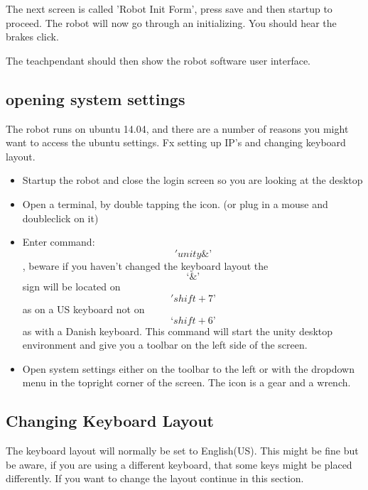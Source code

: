 \documentclass{article}
\begin{document}
The next screen is called 'Robot Init Form', press save and then startup to proceed. The robot will now go through an initializing. You should hear the brakes click.

The teachpendant should then show the robot software user interface.  

\subsection{opening system settings}
\label{subsec:OpenSystemSettings}
The robot runs on ubuntu 14.04, and there are a number of reasons you might want to access the ubuntu settings. Fx setting up IP's and changing keyboard layout. 

\begin{itemize}
	\item Startup the robot and close the login screen so you are looking at the desktop
	\item Open a terminal, by double tapping the icon. (or plug in a mouse and doubleclick on it)
	\item Enter command: $$'unity\&’$$, beware if you haven't changed the keyboard layout the $$‘\&’$$ sign will be located on $$'shift+7’$$ as on a US keyboard not on $$‘shift+6’$$ as with a Danish keyboard. This command will start the unity desktop environment and give you a toolbar on the left side of the screen.
	\item Open system settings either on the toolbar to the left or with the dropdown menu in the topright corner of the screen. The icon is a gear and a wrench. 
\end{itemize}

\subsection{Changing Keyboard Layout}
The keyboard layout will normally be set to English(US). This might be fine but be aware, if you are using a different keyboard, that some keys might be placed differently. If you want to change the layout continue in this section.
\end{document}
